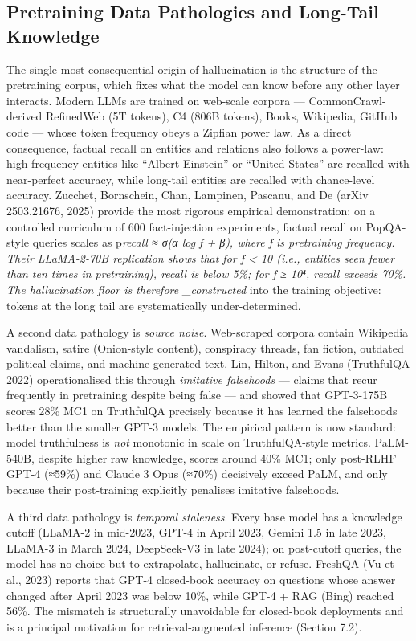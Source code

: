 \documentclass{article}
\begin{document}
\subsection{Pretraining Data Pathologies and Long-Tail Knowledge}\label{pretraining-data-pathologies-and-long-tail-knowledge}

The single most consequential origin of hallucination is the structure of the pretraining corpus, which fixes what the model can know before any other layer interacts. Modern LLMs are trained on web-scale corpora --- CommonCrawl-derived RefinedWeb (5T tokens), C4 (806B tokens), Books, Wikipedia, GitHub code --- whose token frequency obeys a Zipfian power law. As a direct consequence, factual recall on entities and relations also follows a power-law: high-frequency entities like ``Albert Einstein'' or ``United States'' are recalled with near-perfect accuracy, while long-tail entities are recalled with chance-level accuracy. Zucchet, Bornschein, Chan, Lampinen, Pascanu, and De (arXiv 2503.21676, 2025) provide the most rigorous empirical demonstration: on a controlled curriculum of 600 fact-injection experiments, factual recall on PopQA-style queries scales as p\emph{recall ≈ σ(α log f + β), where f is pretraining frequency. Their LLaMA-2-70B replication shows that for f \textless{} 10 (i.e., entities seen fewer than ten times in pretraining), recall is below 5\%; for f ≥ 10⁴, recall exceeds 70\%. The hallucination floor is therefore \_constructed} into the training objective: tokens at the long tail are systematically under-determined.

A second data pathology is \emph{source noise}. Web-scraped corpora contain Wikipedia vandalism, satire (Onion-style content), conspiracy threads, fan fiction, outdated political claims, and machine-generated text. Lin, Hilton, and Evans (TruthfulQA 2022) operationalised this through \emph{imitative falsehoods} --- claims that recur frequently in pretraining despite being false --- and showed that GPT-3-175B scores 28\% MC1 on TruthfulQA precisely because it has learned the falsehoods better than the smaller GPT-3 models. The empirical pattern is now standard: model truthfulness is \emph{not} monotonic in scale on TruthfulQA-style metrics. PaLM-540B, despite higher raw knowledge, scores around 40\% MC1; only post-RLHF GPT-4 (≈59\%) and Claude 3 Opus (≈70\%) decisively exceed PaLM, and only because their post-training explicitly penalises imitative falsehoods.

A third data pathology is \emph{temporal staleness}. Every base model has a knowledge cutoff (LLaMA-2 in mid-2023, GPT-4 in April 2023, Gemini 1.5 in late 2023, LLaMA-3 in March 2024, DeepSeek-V3 in late 2024); on post-cutoff queries, the model has no choice but to extrapolate, hallucinate, or refuse. FreshQA (Vu et al., 2023) reports that GPT-4 closed-book accuracy on questions whose answer changed after April 2023 was below 10\%, while GPT-4 + RAG (Bing) reached 56\%. The mismatch is structurally unavoidable for closed-book deployments and is a principal motivation for retrieval-augmented inference (Section 7.2).
\end{document}
